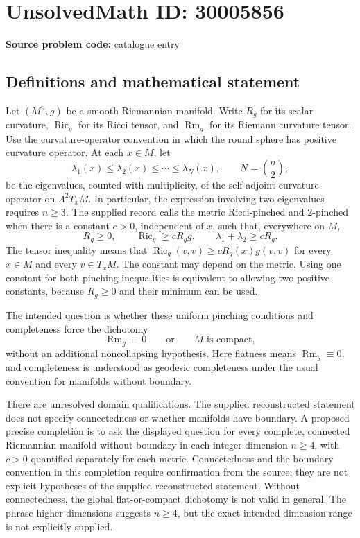 \documentclass[11pt]{article}
\begin{document}
\section*{UnsolvedMath ID: 30005856}
\textbf{Source problem code:} catalogue entry
\subsection{Definitions and mathematical statement}
Let \((M^n,g)\) be a smooth Riemannian manifold. Write \(R_g\) for its scalar curvature, \(\operatorname{Ric}_g\) for its Ricci tensor, and \(\operatorname{Rm}_g\) for its Riemann curvature tensor. Use the curvature-operator convention in which the round sphere has positive curvature operator. At each \(x\in M\), let
\[
\lambda_1(x)\leq\lambda_2(x)\leq\cdots\leq\lambda_{N}(x),\qquad N=\binom n2,
\]
be the eigenvalues, counted with multiplicity, of the self-adjoint curvature operator on \(\Lambda^2T_xM\). In particular, the expression involving two eigenvalues requires \(n\geq3\). The supplied record calls the metric Ricci-pinched and \(2\)-pinched when there is a constant \(c>0\), independent of \(x\), such that, everywhere on \(M\),
\[
R_g\geq0,\qquad \operatorname{Ric}_g\geq cR_g g,\qquad \lambda_1+\lambda_2\geq cR_g.
\]
The tensor inequality means that \(\operatorname{Ric}_g(v,v)\geq cR_g(x)g(v,v)\) for every \(x\in M\) and every \(v\in T_xM\). The constant may depend on the metric. Using one constant for both pinching inequalities is equivalent to allowing two positive constants, because \(R_g\geq0\) and their minimum can be used.

The intended question is whether these uniform pinching conditions and completeness force the dichotomy
\[
\operatorname{Rm}_g\equiv0\qquad\text{or}\qquad M\text{ is compact},
\]
without an additional noncollapsing hypothesis. Here flatness means \(\operatorname{Rm}_g\equiv0\), and completeness is understood as geodesic completeness under the usual convention for manifolds without boundary.

There are unresolved domain qualifications. The supplied reconstructed statement does not specify connectedness or whether manifolds have boundary. A proposed precise completion is to ask the displayed question for every complete, connected Riemannian manifold without boundary in each integer dimension \(n\geq4\), with \(c>0\) quantified separately for each metric. Connectedness and the boundary convention in this completion require confirmation from the source; they are not explicit hypotheses of the supplied reconstructed statement. Without connectedness, the global flat-or-compact dichotomy is not valid in general. The phrase higher dimensions suggests \(n\geq4\), but the exact intended dimension range is not explicitly supplied.
\end{document}
